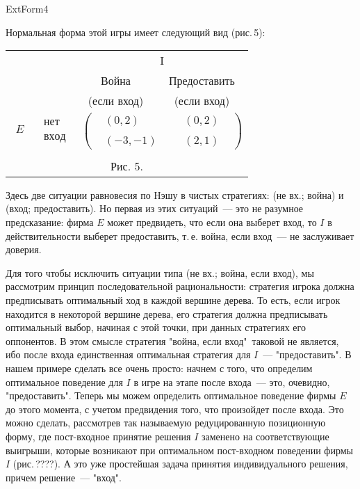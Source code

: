 ExtForm4


Нормальная форма этой игры имеет следующий вид (рис.\,5):

\begin{center}
\begin{tabular}{cccc}
&&\multicolumn{2}{c}{I}\\
&& Война &  Предоставить\\
&&(если вход)&   (если вход) \\
$\begin{array}{c} {}\\ E\\ {}\\ \end{array}$ &$\begin{array}{c} нет\\ \\
вход\end{array}$& \multicolumn{2}{c}{
$\left(\begin{array}{cccccc} &(0,2)&&&(0,2)&\\
\\
&(-3,-1)&&&(2,1)& \end{array} \right)$}\\
\multicolumn{4}{c}{}\\
\multicolumn{4}{c}{Рис. 5.}\\
\end{tabular}
\end{center}

Здесь две ситуации равновесия по Hэшу  в чистых стратегиях: (не
вх.; война) и (вход; предоставить).  Но первая из этих
ситуаций~--- это не разумное предсказание: фирма $E$ может
предвидеть, что если она выберет вход, то $I$ в действительности
выберет предоставить, т.\,е. война, если вход~--- не заслуживает
доверия.

Для того чтобы исключить ситуации типа (не вх.; война, если вход),
мы рассмотрим принцип последовательной рациональности: стратегия
игрока должна предписывать оптимальный ход в каждой вершине
дерева. То есть, если игрок находится в некоторой вершине дерева,
его стратегия должна предписывать оптимальный выбор, начиная с
этой точки, при данных стратегиях его оппонентов.  В этом смысле
стратегия "война, если вход"\, таковой не является, ибо после
входа единственная оптимальная стратегия для $I$~---
"предоставить".  В нашем примере сделать все очень просто: начнем
с того, что определим оптимальное поведение для $I$ в игре на
этапе после входа~--- это, очевидно, "предоставить".  Теперь мы
можем определить оптимальное поведение фирмы $E$ до этого момента,
с учетом предвидения того, что произойдет после входа. Это можно
сделать, рассмотрев так называемую редуцированную позиционную
форму, где пост-входное принятие решения $I$ заменено на
соответствующие выигрыши, которые возникают при оптимальном
пост-входном поведении фирмы $I$ (рис.\,????). А это уже
простейшая задача принятия индивидуального решения, причем
решение~--- "вход".


